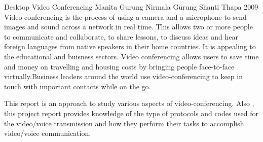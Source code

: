  \begin{conf-abstract}[]
{Desktop Video Conferencing}
{
Manita Gurung
Nirmala Gurung 
Shanti Thapa
}
{2009}
Video conferencing is the process of using a camera and a microphone to send images and sound across a network in real time. This allows two or more people to communicate and collaborate, to share lessons, to discuss ideas and hear foreign languages from native speakers in their home countries. It is appealing to the educational and buisness sectors. Video conferencing allows users to save time and money on travelling and housing costs by bringing people face-to-face virtually.Business leaders around the world use video-conferencing to keep in touch with important contacts while on the go.

This report is an approach to study various aspects of video-conferencing. Also , this project report provides knowledge of the type of protocols and codes used for the video/voice transmission and how they perform their tasks to accomplish video/voice communication.
  \end{conf-abstract}